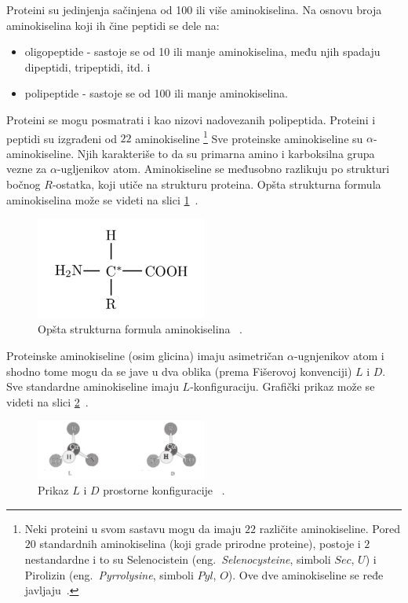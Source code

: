 Proteini su jedinjenja sačinjena od 100 ili više aminokiselina. Na osnovu broja aminokiselina koji ih čine peptidi se dele na:
\begin{itemize}
\item oligopeptide - sastoje se od 10 ili manje aminokiselina, među njih spadaju dipeptidi, tripeptidi, itd. i 
\item polipeptide - sastoje se od 100 ili manje aminokiselina.
\end{itemize}
Proteini se mogu posmatrati i kao nizovi nadovezanih polipeptida.
Proteini i peptidi su izgrađeni od $22$ aminokiseline \footnote{Neki proteini u svom sastavu mogu da imaju $22$ različite aminokiseline. Pored $20$ standardnih aminokiselina (koji grade prirodne proteine), postoje i $2$ nestandardne i to su Selenocistein (eng.~{\em Selenocysteine}, simboli $Sec$, $U$) i Pirolizin (eng.~{\em Pyrrolysine},
simboli $Pyl$, $O$). Ove dve aminokiseline se ređe javljaju~\cite{MarijaJ}.}
Sve proteinske aminokiseline su $\alpha$-aminokiseline. Njih karakteriše to da su primarna amino i karboksilna grupa vezne za $\alpha$-ugljenikov atom. Aminokiseline se međusobno razlikuju po strukturi bočnog $R$-ostatka, koji utiče na strukturu proteina. Opšta strukturna formula aminokiselina može se videti na slici \ref{fig:aminokiselina}~\cite{Principi}. 
\begin{figure}[h]
	\centering
    \includegraphics[width=0.5\textwidth]{Figures/BO/aminokiselina.png}
    \caption{Opšta strukturna formula aminokiselina ~\cite{Principi}.}
    \label{fig:aminokiselina}
\end{figure}
Proteinske aminokiseline (osim glicina) imaju asimetričan $\alpha$-ugnjenikov atom i shodno tome mogu da se jave u dva oblika (prema Fišerovoj konvenciji) $L$ i $D$. Sve standardne aminokiseline imaju $L$-konfiguraciju. Grafički prikaz može se videti na slici \ref{fig:LDkonfig}~\cite{Principi}.
\begin{figure}[H]
	\centering
    \includegraphics[width=0.5\textwidth]{Figures/BO/LDkonfig.png}
    \caption{Prikaz $L$ i $D$ prostorne konfiguracije ~\cite{Principi}.}
    \label{fig:LDkonfig}
\end{figure}
